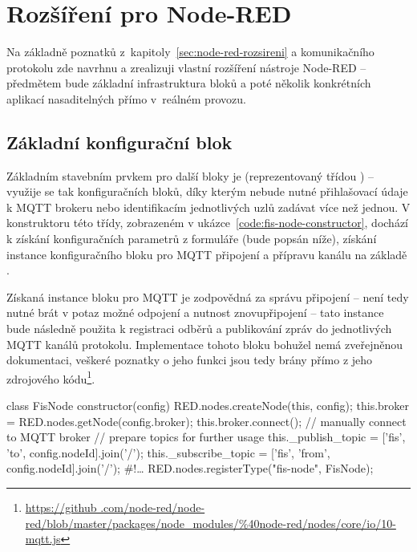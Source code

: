\chapter{Rozšíření pro Node-RED}
\label{ch:rozsireni}

Na základně poznatků z~kapitoly~\ref{sec:node-red-rozsireni} a komunikačního protokolu zde navrhnu a zrealizuji vlastní
rozšíření nástroje Node-RED -- předmětem bude základní infrastruktura bloků a poté několik konkrétních aplikací
nasaditelných přímo v~reálném provozu.

\section{Základní konfigurační blok}\label{sec:zakladni-konfiguracni-blok}
Základním stavebním prvkem pro další bloky je  (reprezentovaný třídou ) -- využije se tak
konfiguračních bloků, díky kterým
nebude nutné přihlašovací údaje k MQTT brokeru nebo identifikacím jednotlivých uzlů zadávat více než jednou.
V konstruktoru této třídy, zobrazeném v ukázce~\ref{code:fis-node-constructor}, dochází k získání konfiguračních
parametrů z formuláře (bude popsán níže), získání instance konfiguračního bloku pro MQTT připojení a přípravu kanálu
na základě .

Získaná instance bloku pro MQTT je zodpovědná za správu připojení -- není tedy nutné brát v potaz možné odpojení a
nutnost znovupřipojení -- tato instance bude následně použita k registraci odběrů a publikování zpráv do jednotlivých
MQTT kanálů protokolu.
Implementace tohoto bloku bohužel nemá zveřejněnou dokumentaci, veškeré poznatky o jeho funkci jsou tedy brány přímo
z jeho zdrojového kódu\footnote{\url{https://github
.com/node-red/node-red/blob/master/packages/node_modules/\%40node-red/nodes/core/io/10-mqtt.js}}.

\begin{code}[
    numbers=left,
    language=Javascript,
    label=code:fis-node-constructor,
    caption={Část konstruktoru třídy \ic{FisNode} obluhující připojení MQTT brokeru a přípravu kanálů pro komunikaci.}
]
class FisNode {
    constructor(config) {
        RED.nodes.createNode(this, config);
        this.broker = RED.nodes.getNode(config.broker);
        this.broker.connect(); // manually connect to MQTT broker
        // prepare topics for further usage
        this._publish_topic = ['fis', 'to', config.nodeId].join('/');
        this._subscribe_topic = ['fis', 'from', config.nodeId].join('/');
    }
    #!\ldots
    RED.nodes.registerType("fis-node", FisNode);
}
\end{code}

